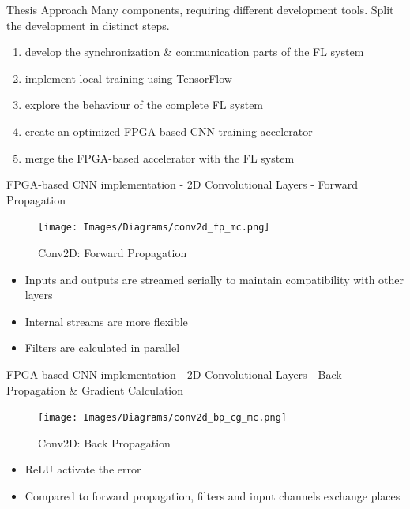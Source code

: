 \begin{frame}{Thesis Approach}
Many components, requiring different development tools.
Split the development in distinct steps.\\
	\begin{enumerate}
	    \item develop the synchronization \& communication parts of the FL system
	    \item implement local training using TensorFlow
	    \item explore the behaviour of the complete FL system
	    \item create an optimized FPGA-based CNN training accelerator
	    \item merge the FPGA-based accelerator with the FL system
	\end{enumerate}
\end{frame}

\begin{frame}{FPGA-based CNN implementation - 2D Convolutional Layers - Forward Propagation}
	\begin{minipage}{0.4\textwidth}
    	\begin{figure}[H]
            \centering
    		\texttt{[image: Images/Diagrams/conv2d\_fp\_mc.png]}
            \caption*{Conv2D: Forward Propagation}
    	\end{figure}%
	\end{minipage}%
	\begin{minipage}{0.6\textwidth}
    	\begin{itemize}
    	    \item Inputs and outputs are streamed serially to maintain compatibility with other layers
    	    \item Internal streams are more flexible
    	    \item Filters are calculated in parallel
    	\end{itemize}
	\end{minipage}%
\end{frame}

\begin{frame}{FPGA-based CNN implementation - 2D Convolutional Layers - Back Propagation \& Gradient Calculation}
	\begin{minipage}{0.4\textwidth}
    	\begin{figure}[H]
            \centering
    		\texttt{[image: Images/Diagrams/conv2d\_bp\_cg\_mc.png]}
            \caption*{Conv2D: Back Propagation}
    	\end{figure}%
	\end{minipage}%
	\begin{minipage}{0.6\textwidth}
    	\begin{itemize}
    	    \item ReLU activate the error
    	    \item Compared to forward propagation, filters and input channels exchange places
    	\end{itemize}
	\end{minipage}%
\end{frame}

